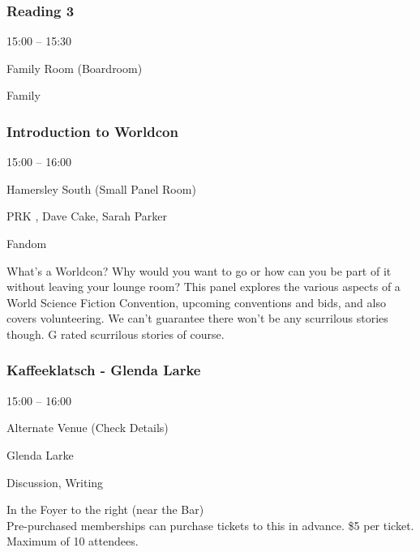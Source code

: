 \documentclass{scrreprt}
\begin{document}
\begin{multicols}{2}
\subsubsection*{Reading 3}\begin{description}
\setlength{\itemsep}{0pt}
\setlength{\parsep}{0pt}
\setlength{\parskip}{0pt}
\item[Time:]{15:00 -- 15:30}
\item[Venue:]{Family Room (Boardroom)}
\item[Tags:]{Family}\end{description}

\subsubsection*{Introduction to Worldcon}\begin{description}
\setlength{\itemsep}{0pt}
\setlength{\parsep}{0pt}
\setlength{\parskip}{0pt}
\item[Time:]{15:00 -- 16:00}
\item[Venue:]{Hamersley South (Small Panel Room)}
\item[People:]{PRK , Dave Cake, Sarah Parker}
\item[Tags:]{Fandom}\end{description}
What's a Worldcon? Why would you want to go or how can you be part of it without leaving your lounge room? This panel explores the various aspects of a World Science Fiction Convention, upcoming conventions and bids, and also covers volunteering. We can't guarantee there won't be any scurrilous stories though. G rated scurrilous stories of course.
\subsubsection*{Kaffeeklatsch - Glenda Larke}\begin{description}
\setlength{\itemsep}{0pt}
\setlength{\parsep}{0pt}
\setlength{\parskip}{0pt}
\item[Time:]{15:00 -- 16:00}
\item[Venue:]{Alternate Venue (Check Details)}
\item[People:]{Glenda Larke}
\item[Tags:]{Discussion, Writing}\end{description}
In the Foyer to the right (near the Bar) \\Pre-purchased memberships can purchase tickets to this in advance. \$5 per ticket. Maximum of 10 attendees.

\end{multicols}
\end{document}
